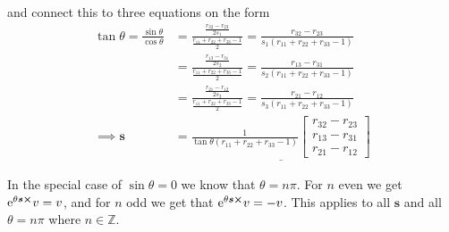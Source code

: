 \documentclass[a4paper]{scrartcl}
\newcommand{\me}[1]{\mathrm{e}^{#1}}
\begin{document}
and connect this to three equations on the form
\begin{equation}
    \begin{aligned}
        \tan\theta = \frac{\sin\theta}{\cos\theta} &= \frac{\tfrac{r_{32} - r_{23}}{2s_1}}{\tfrac{r_{11} + r_{22} + r_{33} -1}{2}} = \frac{r_{32} - r_{23}}{s_1(r_{11} + r_{22} + r_{33} -1)}\\
        &= \frac{\tfrac{r_{13} - r_{31}}{2s_2}}{\tfrac{r_{11} + r_{22} + r_{33} -1}{2}} = \frac{r_{13} - r_{31}}{s_2(r_{11} + r_{22} + r_{33} -1)}\\
        &= \frac{\tfrac{r_{21} - r_{12}}{2s_3}}{\tfrac{r_{11} + r_{22} + r_{33} -1}{2}} = \frac{r_{21} - r_{12}}{s_3(r_{11} + r_{22} + r_{33} -1)}\\
        \implies \bm{s} &= \underline{\frac{1}{\tan\theta(r_{11} + r_{22} + r_{33} -1)} \begin{bmatrix}
            r_{32} - r_{23}\\
            r_{13} - r_{31}\\
            r_{21} - r_{12}
        \end{bmatrix}}
    \end{aligned}
\end{equation}

In the special case of $\sin\theta = 0$ we know that $\theta = n\pi$. For $n$ even we get $\me{\theta \bm{s}\cross}v = v$, and for $n$ odd we get that $\me{\theta \bm{s}\cross}v = -v$. This applies to all $\bm{s}$ and all $\theta=n\pi$ where $n \in \mathbb{Z}$.
\end{document}
